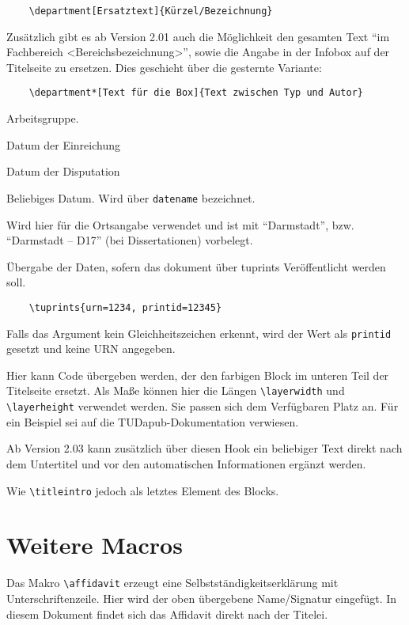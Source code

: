 \documentclass[
	ngerman,
	ruledheaders=section,%
	class=report,%
	thesis={type=bachelor},%
	accentcolor=9c,%
	custommargins=true,%
	marginpar=false,%
	parskip=half-,%
	fontsize=11pt,%
]{tudapub}
\let\code\texttt
\let\tbs\textbackslash
\begin{document}
\begin{description}
	\begin{verbatim}
	\department[Ersatztext]{Kürzel/Bezeichnung}
	\end{verbatim}
	Zusätzlich gibt es ab Version 2.01 auch die Möglichkeit den gesamten Text \enquote{im Fachbereich <Bereichsbezeichnung>}, sowie die Angabe in der Infobox auf der Titelseite zu ersetzen. Dies geschieht über die gesternte Variante:
	\begin{verbatim}
	\department*[Text für die Box]{Text zwischen Typ und Autor}
	\end{verbatim}
	\item[group] Arbeitsgruppe.
	\item[submissiondate] Datum der Einreichung
	\item[examdate] Datum der Disputation
	\item[date] Beliebiges Datum. Wird über \verb|datename| bezeichnet.
	\item[publishers] Wird hier für die Ortsangabe verwendet und ist mit \enquote{Darmstadt}, bzw. \enquote{Darmstadt -- D17} (bei Dissertationen) vorbelegt.
	\item[tuprints] \label{page:tuprints}Übergabe der Daten, sofern das dokument über tuprints Veröffentlicht werden soll.
	\begin{verbatim}
	\tuprints{urn=1234, printid=12345}
	\end{verbatim}
	Falls das Argument kein Gleichheitszeichen erkennt, wird der Wert als \code{printid} gesetzt und keine URN angegeben.

	\item[titleimage] Hier kann Code übergeben werden, der den farbigen Block im unteren Teil der Titelseite ersetzt. Als Maße können hier die Längen \verb+\layerwidth+ und \verb+\layerheight+ verwendet werden. Sie passen sich dem Verfügbaren Platz an. Für ein Beispiel sei auf die TUDapub-Dokumentation verwiesen.
	\item[titleintro] Ab Version 2.03 kann zusätzlich über diesen Hook ein beliebiger Text direkt nach dem Untertitel und vor den automatischen Informationen ergänzt werden.
	\item[titleaddendum] Wie \code{\tbs{}titleintro} jedoch als letztes Element des Blocks.
\end{description}

\section{Weitere Macros}
Das Makro \verb+\affidavit+ erzeugt eine Selbstständigkeitserklärung mit Unterschriftenzeile. Hier wird der oben übergebene Name/Signatur eingefügt.
In diesem Dokument findet sich das Affidavit direkt nach der Titelei.
\end{document}
